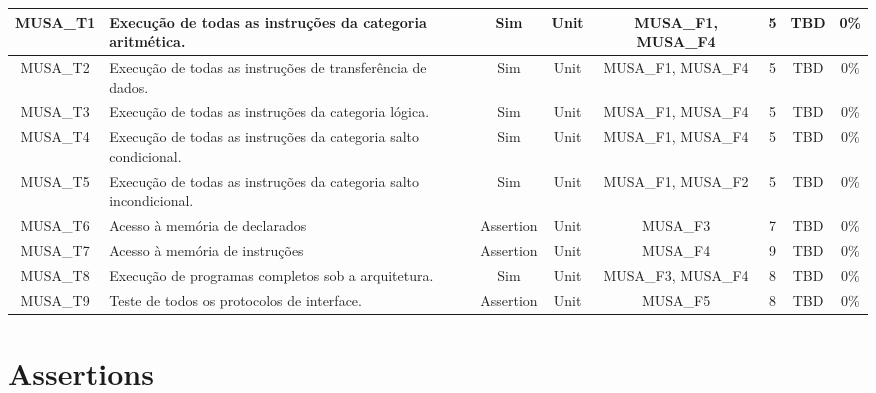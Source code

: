 \documentclass{article}
\begin{document}
\begin{landscape}
\begin{center}
\begin{longtable}[pos]{| c | m{5cm} | c | c | c | c | c | c |}
        \hline
        \endlastfoot
      	MUSA\_T1      & Execução de todas as instruções da categoria aritmética.          &	Sim       & Unit & MUSA\_F1, MUSA\_F4 & 5 & TBD & 0\% \\ \hline   
      	MUSA\_T2      & Execução de todas as instruções de transferência de dados.        &	Sim       & Unit & MUSA\_F1, MUSA\_F4 & 5 & TBD & 0\% \\ \hline   
      	MUSA\_T3      & Execução de todas as instruções da categoria lógica.              &	Sim       & Unit & MUSA\_F1, MUSA\_F4 & 5 & TBD & 0\% \\ \hline  
      	MUSA\_T4      & Execução de todas as instruções da categoria salto condicional.   &	Sim       & Unit & MUSA\_F1, MUSA\_F4 & 5 & TBD & 0\% \\ \hline 
      	MUSA\_T5      & Execução de todas as instruções da categoria salto incondicional. &	Sim       & Unit & MUSA\_F1, MUSA\_F2 & 5 & TBD & 0\% \\ \hline 
	      MUSA\_T6      & Acesso à memória de declarados                                    &	Assertion & Unit & MUSA\_F3           & 7 & TBD & 0\% \\ \hline        
	      MUSA\_T7      & Acesso à memória de instruções                                    &	Assertion & Unit & MUSA\_F4           & 9 & TBD & 0\% \\ \hline        
	      MUSA\_T8      & Execução de programas completos sob a arquitetura.                &	Sim       & Unit & MUSA\_F3, MUSA\_F4 & 8 & TBD & 0\% \\ \hline        
	      MUSA\_T9      & Teste de todos os protocolos de interface.                        & Assertion & Unit & MUSA\_F5           & 8 & TBD & 0\% \\ \hline        

      \end{longtable}
    \end{center}		
  \end{landscape}
  
  \newpage
	\section{Assertions}
\end{document}
